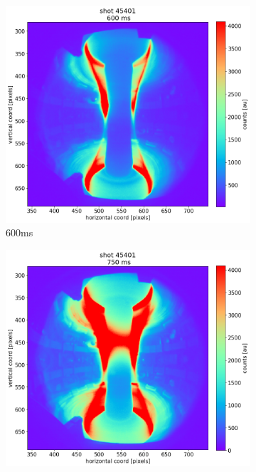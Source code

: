\begin{figure}
    \centering
    \begin{subfigure}{0.3\linewidth}
         \centering
         \includegraphics[trim={60 0 120 60},clip,width=\textwidth]{Chapters/chapter2/figs/45473_for_paper_600ms.png}
         \caption{600ms}
         \label{fig:mu01_tomo4a}
    \end{subfigure}
    \begin{subfigure}{0.3\linewidth}
         \centering
         \includegraphics[trim={60 0 120 60},clip,width=\textwidth]{Chapters/chapter2/figs/45473_for_paper_750ms.png}

\end{subfigure}
\end{figure}
